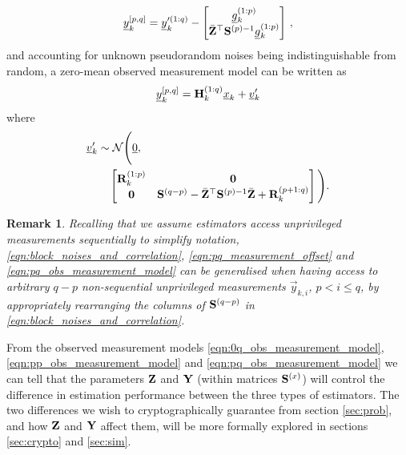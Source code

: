 \documentclass[letterpaper, 10 pt, conference]{ieeeconf}
\newtheorem{remark}{Remark}
\begin{document}
\begin{LaTeXdescription}
\begin{equation}
    {\underline{y}}_k^{[p,q]}={\underline{y}}_k^{\prime(1:q)} - 
    \begin{bmatrix}
      {\underline{g}}_k^{(1:p)}\\
      \bar{{{\mathbf{Z}}}}^\top{\ensuremath{{\mathbf{S}}}}^{(p)-1}{\underline{g}}_k^{(1:p)}
    \end{bmatrix}\,,
  \end{equation}
  and accounting for unknown pseudorandom noises being indistinguishable from random, a zero-mean observed measurement model can be written as
  \begin{equation}\label{eqn:pq_obs_measurement_model}
    {\underline{y}}_k^{[p,q]} = {{\mathbf{H}}}_k^{(1:q)}{\underline{x}}_k + {\underline{v}}_k^{\prime}
  \end{equation}
  where 
  \begin{equation*}
    \begin{split}
      &{\underline{v}}_k^{\prime} \sim \mathcal{N}\Bigg({\underline{0}},\\
      &\qquad 
      \begin{bmatrix}
        {\ensuremath{{\mathbf{R}}}}_k^{(1:p)} & {{\mathbf{0}}}\\
        {{\mathbf{0}}} & {{\mathbf{S}}}^{(q-p)} - \bar{{{\mathbf{Z}}}}^\top{\ensuremath{{\mathbf{S}}}}^{(p)-1}\bar{{{\mathbf{Z}}}} + {{\mathbf{R}}}_k^{(p+1:q)}
      \end{bmatrix}\Bigg).
    \end{split}
  \end{equation*}
\end{LaTeXdescription}
\begin{remark}
  Recalling that we assume estimators access unprivileged measurements sequentially to simplify notation, \eqref{eqn:block_noises_and_correlation}, \eqref{eqn:pq_measurement_offset} and \eqref{eqn:pq_obs_measurement_model} can be generalised when having access to arbitrary $q-p$ non-sequential unprivileged measurements $\vec{y}_{k,i}$, $p<i\leq q$, by appropriately rearranging the columns of ${{\mathbf{S}}}^{(q-p)}$ in \eqref{eqn:block_noises_and_correlation}.
\end{remark}

From the observed measurement models \eqref{eqn:0q_obs_measurement_model}, \eqref{eqn:pp_obs_measurement_model} and \eqref{eqn:pq_obs_measurement_model} we can tell that the parameters ${{\mathbf{Z}}}$ and ${{\mathbf{Y}}}$ (within matrices ${{\mathbf{S}}}^{(x)}$) will control the difference in estimation performance between the three types of estimators. The two differences we wish to cryptographically guarantee from section \ref{sec:prob}, and how ${{\mathbf{Z}}}$ and ${{\mathbf{Y}}}$ affect them, will be more formally explored in sections \ref{sec:crypto} and \ref{sec:sim}.
\end{document}

